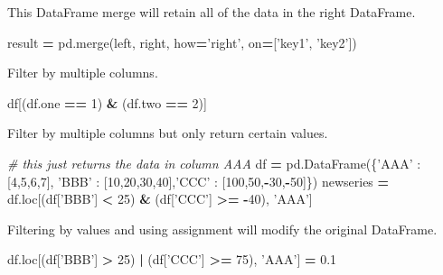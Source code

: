 \documentclass[]{book}
\newenvironment{Shaded}{\begin{snugshade}}{\end{snugshade}}
\newcommand{\DecValTok}[1]{\textcolor[rgb]{0.00,0.00,0.81}{#1}}
\newcommand{\FloatTok}[1]{\textcolor[rgb]{0.00,0.00,0.81}{#1}}
\newcommand{\StringTok}[1]{\textcolor[rgb]{0.31,0.60,0.02}{#1}}
\newcommand{\CommentTok}[1]{\textcolor[rgb]{0.56,0.35,0.01}{\textit{#1}}}
\newcommand{\OperatorTok}[1]{\textcolor[rgb]{0.81,0.36,0.00}{\textbf{#1}}}
\newcommand{\NormalTok}[1]{#1}
\begin{document}
This DataFrame merge will retain all of the data in the right DataFrame.

\begin{Shaded}
\begin{Highlighting}[]
\NormalTok{result }\OperatorTok{=}\NormalTok{ pd.merge(left, right, how}\OperatorTok{=}\StringTok{'right'}\NormalTok{, on}\OperatorTok{=}\NormalTok{[}\StringTok{'key1'}\NormalTok{, }\StringTok{'key2'}\NormalTok{])}
\end{Highlighting}
\end{Shaded}

Filter by multiple columns.

\begin{Shaded}
\begin{Highlighting}[]
\NormalTok{df[(df.one }\OperatorTok{==} \DecValTok{1}\NormalTok{) }\OperatorTok{&}\NormalTok{ (df.two }\OperatorTok{==} \DecValTok{2}\NormalTok{)]}
\end{Highlighting}
\end{Shaded}

Filter by multiple columns but only return certain values.

\begin{Shaded}
\begin{Highlighting}[]
\CommentTok{# this just returns the data in column AAA}
\NormalTok{df }\OperatorTok{=}\NormalTok{ pd.DataFrame(\{}\StringTok{'AAA'}\NormalTok{ : [}\DecValTok{4}\NormalTok{,}\DecValTok{5}\NormalTok{,}\DecValTok{6}\NormalTok{,}\DecValTok{7}\NormalTok{], }\StringTok{'BBB'}\NormalTok{ : [}\DecValTok{10}\NormalTok{,}\DecValTok{20}\NormalTok{,}\DecValTok{30}\NormalTok{,}\DecValTok{40}\NormalTok{],}\StringTok{'CCC'}\NormalTok{ : [}\DecValTok{100}\NormalTok{,}\DecValTok{50}\NormalTok{,}\OperatorTok{-}\DecValTok{30}\NormalTok{,}\OperatorTok{-}\DecValTok{50}\NormalTok{]\})}
\NormalTok{newseries }\OperatorTok{=}\NormalTok{ df.loc[(df[}\StringTok{'BBB'}\NormalTok{] }\OperatorTok{<} \DecValTok{25}\NormalTok{) }\OperatorTok{&}\NormalTok{ (df[}\StringTok{'CCC'}\NormalTok{] }\OperatorTok{>=} \OperatorTok{-}\DecValTok{40}\NormalTok{), }\StringTok{'AAA'}\NormalTok{]}
\end{Highlighting}
\end{Shaded}

Filtering by values and using assignment will modify the original
DataFrame.

\begin{Shaded}
\begin{Highlighting}[]
\NormalTok{df.loc[(df[}\StringTok{'BBB'}\NormalTok{] }\OperatorTok{>} \DecValTok{25}\NormalTok{) }\OperatorTok{|}\NormalTok{ (df[}\StringTok{'CCC'}\NormalTok{] }\OperatorTok{>=} \DecValTok{75}\NormalTok{), }\StringTok{'AAA'}\NormalTok{] }\OperatorTok{=} \FloatTok{0.1}
\end{Highlighting}
\end{Shaded}
\end{document}
